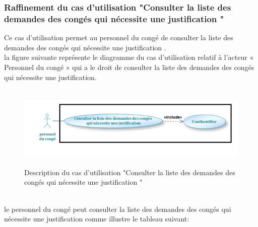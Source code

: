 \documentclass[12 pt]{report}
\begin{document}
\subsubsection{Raffinement du cas d'utilisation "Consulter la liste des demandes des congés qui nécessite une justification "}
Ce cas d'utilisation permet au personnel du congé de consulter la liste des demandes des congés qui nécessite une justification .\\
la figure suivante représente le diagramme du cas d’utilisation  relatif à l’acteur « Personnel du congé » qui a le droit de consulter la liste des demandes des congés qui nécessite une justification.
\begin{figure}[h]
\begin{center}
\includegraphics[width= 13cm , height = 4cm]{cas_con_justififie.PNG}
\caption{Description du cas d'utilisation "Consulter la liste des demandes des congés qui nécessite une justification "}
\end{center}
\end{figure}\\
le personnel du congé peut consulter la liste des demandes des congés qui nécessite une justification  comme illustre le tableau suivant:
\end{document}

